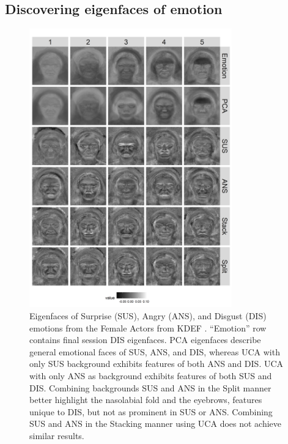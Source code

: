 \documentclass[12pt]{article}
\begin{document}
\subsection{\label{sec:faces}Discovering eigenfaces of emotion}
\begin{figure}[!th]
  \centering
  \includegraphics[width = 0.78\textwidth]{figure/F_Surprise_Angry_Disgust_1.png}
  \caption{Eigenfaces of Surprise (SUS), Angry (ANS), and Disgust (DIS) emotions from the Female Actors from KDEF \cite{Calvo2008}. ``Emotion'' row contains final session DIS eigenfaces. PCA eigenfaces describe general emotional faces of SUS, ANS, and DIS, whereas UCA with only SUS background exhibits features of both ANS and DIS. UCA with only ANS as background exhibits features of both SUS and DIS. Combining backgrounds SUS and ANS in the Split manner better highlight the nasolabial fold and the eyebrows, features unique to DIS, but not as prominent in SUS or ANS. Combining SUS and ANS in the Stacking manner using UCA does not achieve similar results.}
  \label{fig:Faces}
\end{figure}
\end{document}
